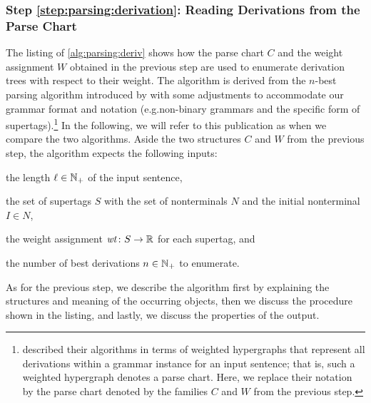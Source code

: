 \documentclass[../../document.tex]{subfiles}
\begin{document}
    \subsubsection*{Step \ref{step:parsing:derivation}: Reading Derivations from the Parse Chart}
    The listing of \cref{alg:parsing:deriv} shows how the parse chart \(C\) and the weight assignment \(W\) obtained in the previous step are used to enumerate derivation trees with respect to their weight.
    The algorithm is derived from the \(n\)-best parsing algorithm introduced by \citet[Algorithms~1, 2 and 3]{HuaChia05} with some adjustments to accommodate our grammar format and notation (e.g.\@ non-binary grammars and the specific form of  supertags).\footnote{
         described their algorithms in terms of weighted hypergraphs that represent all derivations within a grammar instance for an input sentence; that is, such a weighted hypergraph denotes a parse chart.
        Here, we replace their notation by the parse chart denoted by the families \(C\) and \(W\) from the previous step.
    }
    In the following, we will refer to this publication as  when we compare the two algorithms.
    Aside the two structures \(C\) and \(W\) from the previous step, the algorithm expects the following inputs:
    \begin{inparaitem}[]
        \item the length \(\ell \in \mathbb{N}_+\) of the input sentence,
        \item the set of supertags \(S\)  with the set of nonterminals \(N\) and the initial nonterminal \(I \in N\),
        \item the weight assignment \(\mathit{wt}\colon S \to \mathbb{R}\) for each supertag, and
        \item the number of best derivations \(n \in \mathbb{N}_+\) to enumerate.
    \end{inparaitem}
    As for the previous step, we describe the algorithm first by explaining the structures and meaning of the occurring objects, then we discuss the procedure shown in the listing, and lastly, we discuss the properties of the output.
    
\end{document}
